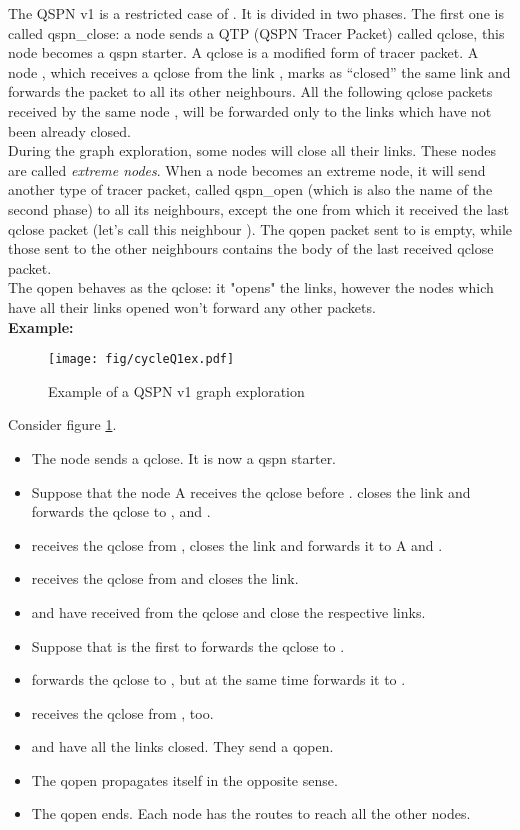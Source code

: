 \documentclass[a4paper]{article}
\begin{document}
The QSPN v1 is a restricted case of . 
It is divided in two phases.
The first one is called qspn\_close:
a node sends a QTP (QSPN Tracer Packet) called qclose, this node becomes a qspn starter.
A qclose is a modified form of tracer packet.
  A node , which receives a qclose from the link , marks as ``closed'' the
  same link  and forwards the packet to all its other neighbours.
  All the following qclose packets received by the same node , will
  be forwarded only to the links which have not been already closed.\\
  During the graph exploration, some nodes will close all their links.
  These nodes are called \emph{extreme nodes}. When a node becomes an extreme node, 
  it will send another type of tracer packet, called qspn\_open (which is also
  the name of the second phase) to all its neighbours, except the one from
  which it received the last qclose packet (let's call this neighbour ).
  The qopen packet sent to  is empty, while those sent to the other
  neighbours contains the body of the last received qclose packet.\\
  The qopen behaves as the qclose: it "opens" the links, however the nodes
  which have all their links opened won't forward any other packets.\\
\textbf{Example: }
  \begin{figure}[h]
  \begin{center}
	  \texttt{[image: fig/cycleQ1ex.pdf]}
	  \caption{Example of a QSPN v1 graph exploration}
	  \label{fig:q1ex}
  \end{center}
  \end{figure}
  Consider figure \ref{fig:q1ex}.
  \begin{itemize}
	  \item The node  sends a qclose. It is now a qspn starter.
	  \item Suppose that the node A receives the qclose before . 
		  closes the link  and forwards the qclose to
		  ,  and .
	  \item  receives the qclose from , closes the link  and forwards it to A and .
	  \item  receives the qclose from  and closes the link.
	  \item  and  have received from  the qclose and close the respective links.
	  \item Suppose that  is the first to forwards the qclose to .
	  \item  forwards the qclose to , but at the same time  forwards it to .
	  \item  receives the qclose from , too.
	  \item  and  have all the links closed. They send a qopen.
	  \item The qopen propagates itself in the opposite sense.
	  \item The qopen ends.  Each node has the routes to reach all the other nodes.
\end{itemize}
\end{document}
